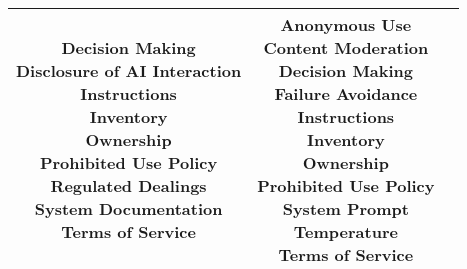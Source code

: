 \documentclass[fleqn]{article}
\begin{document}
\begin{landscape}
\begin{table}[H]
\begin{tabular}{|c|c|c|}
{			\textbullet\hspace{3pt} Decision Making \\
			\textbullet\hspace{3pt} Disclosure of AI Interaction\\ 		
			\textbullet\hspace{3pt} Instructions\\ 	
			\textbullet\hspace{3pt} Inventory\\ 	
			\textbullet\hspace{3pt} Ownership\\ 	
			\textbullet\hspace{3pt} Prohibited Use Policy\\ 	
			\textbullet\hspace{3pt} Regulated Dealings\\ 	
			\textbullet\hspace{3pt} System Documentation\\ 	
			\textbullet\hspace{3pt} Terms of Service\\ 	 	
		}
		& 
		\makecell[l]{
			\textbullet\hspace{3pt} Anonymous Use\\ 	
			\textbullet\hspace{3pt} Content Moderation\\
			\textbullet\hspace{3pt} Decision Making\\  		
			\textbullet\hspace{3pt} Failure Avoidance\\ 	
			\textbullet\hspace{3pt} Instructions\\ 	
			\textbullet\hspace{3pt} Inventory\\ 	
			\textbullet\hspace{3pt} Ownership\\ 
			\textbullet\hspace{3pt} Prohibited Use Policy\\ 	
			\textbullet\hspace{3pt} System Prompt\\ 	
			\textbullet\hspace{3pt} Temperature\\ 	
			\textbullet\hspace{3pt} Terms of Service\\ 	
		} 
		\\
		\hline
	\end{tabular}
	\label{table:low_risk_plan_by_tc1}
\end{table}


\end{landscape}
\end{document}
